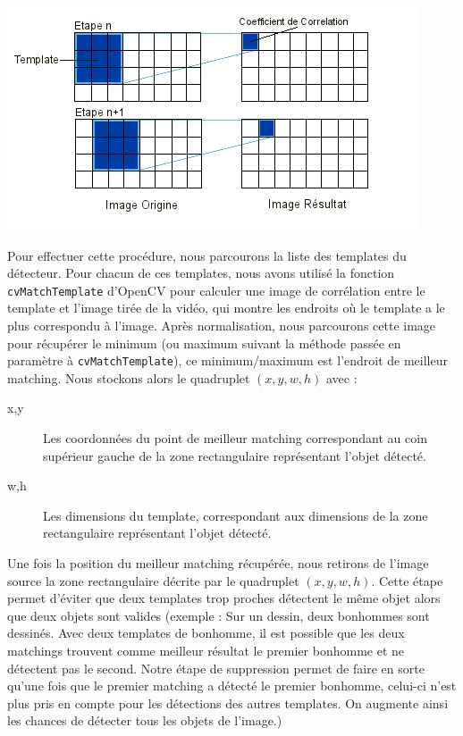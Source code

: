 \begin{center}
\includegraphics[width=\textwidth]{images/templateMatching.png}
\end{center}

Pour effectuer cette procédure, nous parcourons la liste des templates du détecteur. Pour chacun de ces templates, nous avons utilisé la fonction \texttt{cvMatchTemplate} d'OpenCV pour calculer une image de corrélation entre le template et l'image tirée de la vidéo, qui montre les endroits où le template a le plus correspondu à l'image. Après normalisation, nous parcourons cette image pour récupérer le minimum (ou maximum suivant la méthode passée en paramètre à \texttt{cvMatchTemplate}), ce minimum/maximum est l'endroit de meilleur matching. Nous stockons alors le quadruplet $(x,y,w,h)$ avec :
\begin{description}
\item[x,y] Les coordonnées du point de meilleur matching correspondant au coin supérieur gauche de la zone rectangulaire représentant l'objet détecté.
\item[w,h] Les dimensions du template, correspondant aux dimensions de la zone rectangulaire représentant l'objet détecté.\\
\end{description}

Une fois la position du meilleur matching récupérée, nous retirons de l'image source la zone rectangulaire décrite par le quadruplet $(x,y,w,h)$. Cette étape permet d'éviter que deux templates trop proches détectent le même objet alors que deux objets sont valides (exemple : Sur un dessin, deux bonhommes sont dessinés. Avec deux templates de bonhomme, il est possible que les deux matchings trouvent comme meilleur résultat le premier bonhomme et ne détectent pas le second. Notre étape de suppression permet de faire en sorte qu'une fois que le premier matching a détecté le premier bonhomme, celui-ci n'est plus pris en compte pour les détections des autres templates. On augmente ainsi les chances de détecter tous les objets de l'image.)\\

